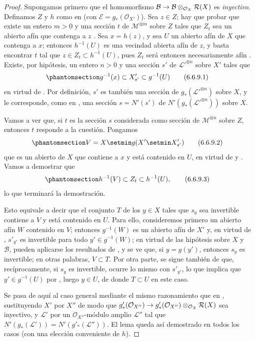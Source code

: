 \documentclass[oneside,10pt]{amsart}
\makeatletter
\newcommand{\ega@arrow}[2]{\mathchoice{#1}{#2}{#2}{#2}}
\renewcommand{\to}{\ega@arrow{\longrightarrow}{\rightarrow}}
\newcommand{\oldpage}[2][]{\marginnote{\normalfont\footnotesize\textbf{#1}~|~#2}\ignorespaces}
\let\EGAOriginalLabel\label
\renewcommand{\label}[1]{\phantomsection\EGAOriginalLabel{#1}}
\makeatother
\begin{document}
\begin{proof}
Supongamos primero que el homomorfismo
$\mathcal{B}\to
\mathcal{B}\otimes_{\mathcal{O}_X}\mathcal{R}(X)$
es \emph{inyectivo}.
Definamos $Z$ y $h$ como en  (con $\mathcal{E}=g_*(\mathcal{O}_{X'})$).
Sea $z\in Z$;
hay que probar que existe un entero $m>0$ y una sección $t$ de $\mathcal{M}^{\otimes m}$ sobre $Z$ tales que $Z_t$ sea un abierto afín que contenga a $z$ .
Sea $x=h(z)$, y sea $U$ un abierto afín de $X$ que contenga a $x$;
entonces $h^{-1}(U)$ es una vecindad abierta afín de $z$, y basta encontrar $t$ tal que
$z\in Z_t\subset h^{-1}(U)$,
pues $Z_t$ será entonces necesariamente afín .
Existe, por hipótesis, un entero $n>0$ y una sección $s'$ de ${\mathcal{L}'}^{\otimes n}$ sobre $X'$ tales que
\[
\label{II.6.6.9.1-fr}
g^{-1}(x)\subset X'_{s'}\subset g^{-1}(U)
\tag{6.6.9.1}
\]
en virtud de .
Por definición, $s'$ es también una sección de $g_*({\mathcal{L}'}^{\otimes n})$ sobre $X$, y le corresponde, como en , una sección
$s=N'(s')$
de
$N'(g_*({\mathcal{L}'}^{\otimes n}))$
sobre
\oldpage[II]{134}
 $X$.

Vamos a ver que, si $t$ es la sección $s$ considerada como sección de $\mathcal{M}^{\otimes n}$ sobre $Z$, entonces $t$ responde a la cuestión.
Pongamos
\[
\label{II.6.6.9.2-fr}
V=X\setmin g(X'\setmin X'_{s'})
\tag{6.6.9.2}
\]
que es un abierto de $X$ que contiene a $x$ y está contenido en $U$, en virtud de  y .
Vamos a demostrar que
\[
\label{II.6.6.9.3-fr}
h^{-1}(V)\subset Z_t\subset h^{-1}(U),
\tag{6.6.9.3}
\]
lo que terminará la demostración.

Esto equivale a decir que el conjunto $T$ de los $y\in X$ tales que $s_y$ sea invertible contiene a $V$ y está contenido en $U$.
Para ello, consideremos primero un abierto afín $W$ contenido en $V$;
entonces $g^{-1}(W)$ es un abierto afín de $X'$ y, en virtud de , $s'_{y'}$ es invertible para todo $y'\in g^{-1}(W)$;
en virtud de las hipótesis sobre $X$ y $\mathcal{B}$, pueden aplicarse los resultados de , y se ve que, si $y=g(y')$, entonces $s_y$ es invertible;
en otras palabras, $V\subset T$.
Por otra parte, se sigue también de  que, recíprocamente, si $s_y$ es invertible, ocurre lo mismo con $s'_{y'}$, lo que implica que $y'\in g^{-1}(U)$ por , luego $y\in U$, de donde $T\subset U$ en este caso.

Se pasa de aquí al caso general mediante el mismo razonamiento que en , sustituyendo $X'$ por $X''$ de modo que
$g'_*(\mathcal{O}_{X''})\to
g'_*(\mathcal{O}_{X''})\otimes_{\mathcal{O}_X}\mathcal{R}(X)$
sea inyectivo, y $\mathcal{L}'$ por un $\mathcal{O}_{X''}$-módulo amplio $\mathcal{L}''$ tal que
$N'(g_*(\mathcal{L}'))=N'(g'_*(\mathcal{L}''))$.
El lema  queda así demostrado en todos los casos (con una elección conveniente de $h$).
\end{proof}
\end{document}
